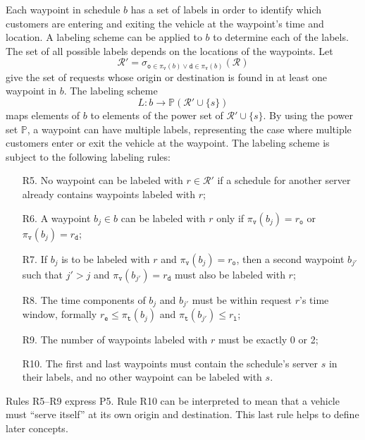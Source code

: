Each waypoint in schedule $b$ has a set of labels in order to identify which
customers are entering and exiting the vehicle at the waypoint's time and location.
A labeling scheme can be applied to $b$ to determine each of the labels. The
set of all possible labels depends on the locations of the waypoints. Let
$$\mathcal{R}'=\sigma_{\texttt{o}\in\pi_\texttt{v}(b)\lor \texttt{d}\in\pi_\texttt{v}(b)}(\mathcal{R})$$
give the set of requests whose origin or destination is found
in at least one waypoint in $b$. The labeling scheme
\begin{equation*}
L:b\rightarrow \mathbb{P}(\mathcal{R}'\cup\{s\})
\end{equation*}
maps elements of $b$ to elements of the power set of $\mathcal{R}'\cup\{s\}$.
By using the power set $\mathbb{P}$,
a waypoint can have multiple labels, representing the case where multiple customers
enter or exit the vehicle at the waypoint.
The labeling scheme is subject to the following labeling rules:
\begin{enumerate}
\item[R5.] No waypoint can be labeled with $r\in\mathcal{R}'$ if a schedule for another server
already contains waypoints labeled with $r$;
\item[R6.] A waypoint $b_j\in b$ can be labeled with $r$ only if
$\pi_\texttt{v}(b_j)=r_\texttt{o}$ or $\pi_\texttt{v}(b_j)=r_\texttt{d}$;
\item[R7.] If $b_j$ is to be labeled with $r$ and $\pi_\texttt{v}(b_j)=r_\texttt{o}$, then
a second waypoint $b_{j'}$ such that $j'>j$ and
$\pi_\texttt{v}(b_{j'})=r_\texttt{d}$ must also be labeled with $r$;
\item[R8.] The time components of $b_j$ and $b_{j'}$ must be within request $r$'s time window,
formally $r_\texttt{e}\leq \pi_\texttt{t}(b_j)$ and $\pi_\texttt{t}(b_{j'})\leq r_\texttt{l}$;
\item[R9.] The number of waypoints labeled with $r$ must be exactly 0 or 2;
\item[R10.] The first and last waypoints must contain the schedule's server $s$
in their labels, and no other waypoint can be labeled with $s$.
\end{enumerate}
Rules R5--R9 express P5.  Rule R10 can be interpreted to mean that a vehicle
must ``serve itself'' at its own origin and destination.  This last rule
helps to define later concepts.

